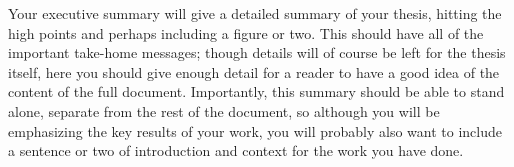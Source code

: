 
Your executive summary will give a detailed summary of your thesis, hitting the high points and perhaps including a figure or two.  This should have all of the important take-home messages; though details will of course be left for the thesis itself, here you should give enough detail for a reader to have a good idea of the content of the full document.  Importantly, this summary should be able to stand alone, separate from the rest of the document, so although you will be emphasizing the key results of your work, you will probably also want to include a sentence or two of introduction and context for the work you have done.
